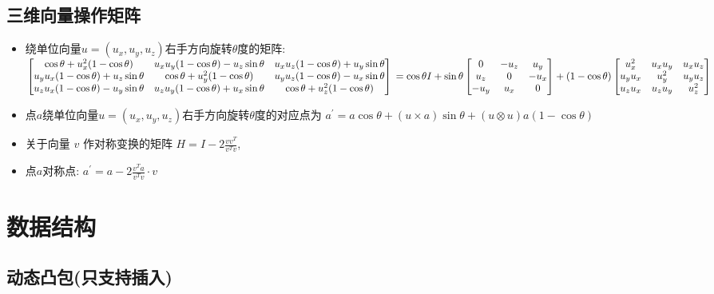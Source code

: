 \documentclass[landscape, twocolumn, 8pt, a4paper, twoside]{extarticle}
\begin{document}
  \subsection{三维向量操作矩阵}
    \begin{itemize}
    \item 绕单位向量$u = (u_x, u_y, u_z)$右手方向旋转$\theta$度的矩阵: \\
      $
      \begin{bmatrix}
        \cos\theta + u_x^2 (1 - \cos\theta)    &    u_x u_y (1 - \cos\theta) - u_z \sin\theta    &    u_x u_z (1 - \cos\theta) + u_y \sin\theta \\
        u_y u_x (1 - \cos\theta) + u_z \sin\theta    &    \cos\theta + u_y^2 (1 - \cos\theta)    &    u_y u_z (1 - \cos\theta) - u_x \sin\theta \\
        u_z u_x (1 - \cos\theta) - u_y \sin\theta    &    u_z u_y (1 - \cos\theta) + u_x \sin\theta    &    \cos\theta + u_z^2 (1 - \cos\theta)
        \end{bmatrix} \\
      = \cos\theta I
      + \sin\theta
        \begin{bmatrix}
          0    &    -u_z    &    u_y \\
          u_z    &    0    &    -u_x \\
          -u_y    &    u_x    &    0
        \end{bmatrix}
      + (1 - \cos\theta)
        \begin{bmatrix}
        u_x ^ 2    &    u_x u_y    &    u_x u_z \\
        u_y u_x    &    u_y ^ 2    &    u_y u_z \\
        u_z u_x    &    u_z u_y    &    u_z ^ 2
      \end{bmatrix}
      $
    \item 点$a$绕单位向量$u = (u_x, u_y, u_z)$右手方向旋转$\theta$度的对应点为
        $a^\prime = a \cos\theta + (u \times a) \sin\theta + (u \otimes u) a (1 - \cos\theta)$
    \item 关于向量 $v$ 作对称变换的矩阵 $H = I - 2 \frac{v v^T}{v^T v}$,
    \item 点$a$对称点: $a^\prime = a - 2 \frac{v^T a}{v^T v} \cdot v$
    \end{itemize}

\section{数据结构}
  \subsection{动态凸包(只支持插入)}
    
    
\end{document}

